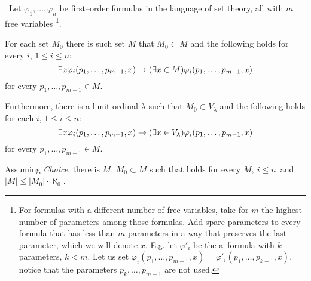 
\begin{lemma}\label{lemma:reflection_lemma}\
Let $\varphi_1, \ldots, \varphi_n$ be first–order formulas in the language of set theory, all with $m$ free variables
\footnote{For formulas with a different number of free variables, take for $m$ the highest number of parameters among those formulas. Add spare parameters to every formula that has less than $m$ parameters in a way that preserves the last parameter, which we will denote $x$.
E.g. let $\varphi'_i$ be the a~formula with $k$ parameters, $k < m$. Let us set $\varphi_i(p_1, \ldots, p_{m-1}, x) = \varphi'_i(p_1, \ldots, p_{k-1}, x)$, notice that the parameters $p_k, \ldots, p_{m-1}$ are not used.}.
\bce[(i)]
\item For each set $M_0$ there is such set $M$ that $M_0 \subset M$ and the following holds for every $i$, $1 \leq i \leq n$:
\begin{equation}\label{equation:refl_lemma_i}
\exists x \varphi_i(p_1, \ldots, p_{m-1}, x) \rightarrow (\exists x \in M) \varphi_i(p_1, \ldots, p_{m-1}, x)
\end{equation}
for every $p_1, \ldots, p_{m-1} \in M$.

\item Furthermore, there is a limit ordinal $\lambda$ such that $M_0 \subset V_\lambda$ and the following holds for each $i$, $1 \leq i \leq n$:
\begin{equation}\label{equation:refl_lemma_ii}
\exists x \varphi_i(p_1, \ldots, p_{m-1}, x) \rightarrow (\exists x \in V_\lambda) \varphi_i(p_1, \ldots, p_{m-1}, x)
\end{equation}
for every $p_1, \ldots, p_{m-1} \in M$.

\item Assuming \emph{Choice}, there is $M$, $M_0 \subset M$ such that  holds for every $M,\ i \leq n$ and $|M| \leq |M_0| \cdot \aleph_0$.
\ece
\end{lemma}

